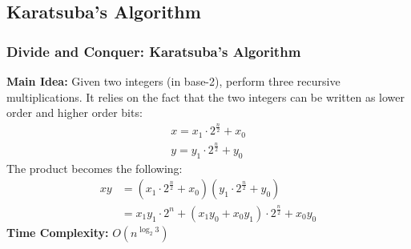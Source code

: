 \documentclass{beamer}
\begin{document}
\subsection{Karatsuba's Algorithm}
\begin{frame}
    \frametitle{Divide and Conquer: Karatsuba's Algorithm}
    \footnotesize
    \textbf{Main Idea:} Given two integers (in base-2), perform three recursive multiplications. It relies on the fact that the two integers can be written as lower order and higher order bits:
    \begin{gather*}
        x = x_1 \cdot 2^{\frac{n}{2}} + x_0 \\
        y = y_1 \cdot 2^\frac{n}{2} + y_0 
    \end{gather*}
    The product becomes the following: 
    \begin{align*}
        xy &= (x_1 \cdot 2^{\frac{n}{2}} + x_0) ( y_1 \cdot 2^\frac{n}{2} + y_0) \\
        &= x_1y_1 \cdot 2^n + (x_1 y_0 + x_0 y_1) \cdot 2^{\frac{n}{2}} + x_0 y_0
    \end{align*}
    \textbf{Time Complexity:} $O(n^{\log_2 3})$
\end{frame}

\begin{frame}
    \IncMargin{2em}
    \begin{algorithm}[H]
        \footnotesize
        \DontPrintSemicolon
        \BlankLine
    \end{algorithm}\DecMargin{2em} 
\end{frame}
\end{document}
